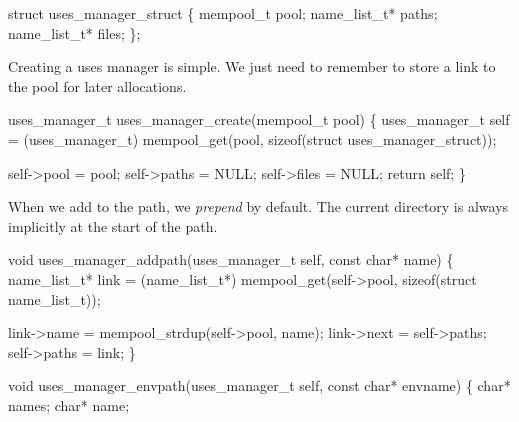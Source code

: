 \nwendcode{}\nwdocspar

\nwenddocs{}\plusendmoddef
struct uses_manager_struct \{
    mempool_t pool;
    name_list_t* paths;
    name_list_t* files;    
\};

\nwendcode{}\nwdocspar

Creating a uses manager is simple.  We just need to remember to store
a link to the pool for later allocations.

\nwenddocs{}\endmoddef
uses_manager_t uses_manager_create(mempool_t pool)
\{
    uses_manager_t self = (uses_manager_t) 
        mempool_get(pool, sizeof(struct uses_manager_struct));

    self->pool = pool;
    self->paths = NULL;
    self->files = NULL;
    return self;
\}

\nwendcode{}\nwdocspar

When we add to the path, we \emph{prepend} by default.  The current
directory is always implicitly at the start of the path.

\nwenddocs{}\plusendmoddef
void uses_manager_addpath(uses_manager_t self, const char* name)
\{
    name_list_t* link = (name_list_t*)
        mempool_get(self->pool, sizeof(struct name_list_t));

    link->name = mempool_strdup(self->pool, name);
    link->next = self->paths;
    self->paths = link;
\}

\nwendcode{}\nwdocspar

\nwenddocs{}\plusendmoddef
void uses_manager_envpath(uses_manager_t self, const char* envname)
\{
    char* names;
    char* name;

